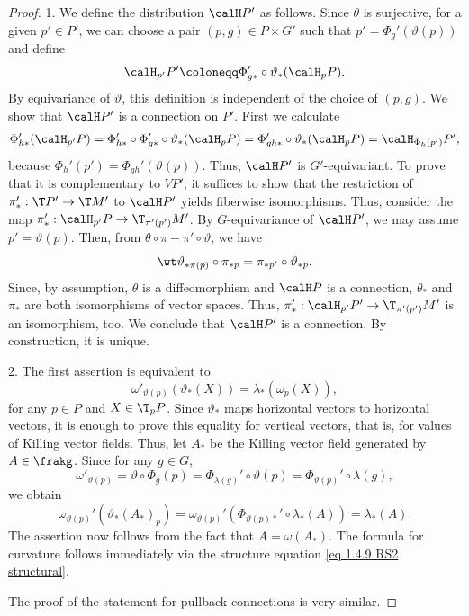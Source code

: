 \begin{proof}
    1. We define the distribution $\calH P'$ as follows. Since $\theta$ is surjective, for a given $p'\in P'$, we can choose a pair $(p,g)\in P\times G'$ such that $p'=\Phi_g'(\vartheta(p))$ and define
    \[\calH_{p'}P'\coloneqq \Phi_{g\ast}'\circ \vartheta_\ast (\calH_{p}P).\]
    By equivariance of $\vartheta$, this definition is independent of the choice of $(p,g)$. We show that $\calH P'$ is a connection on $P'$. First we calculate
    \[\Phi_{h\ast}'(\calH_{p'}P)=\Phi_{h\ast}'\circ \Phi_{g\ast}'\circ\vartheta_\ast(\calH_p P)=\Phi_{gh\ast}'\circ\vartheta_\ast(\calH_pP)=\calH_{\Phi_h(p')}P',\]
    because $\Phi_h'(p')=\Phi_{gh}'(\vartheta(p))$. Thus, $\calH P'$ is $G'$-equivariant. To prove that it is complementary to $VP'$, it suffices to show that the restriction of $\pi_\ast':\T P'\to \T M'$ to $\calH P'$ yields fiberwise isomorphisms. Thus, consider the map $\pi_\ast':\calH_{p'}P\to \T_{\pi'(p')}M'$. By $G$-equivariance of $\calH P'$, we may assume $p'=\vartheta(p)$. Then, from $\theta\circ\pi-\pi'\circ\vartheta$, we have
    \[\wt\vartheta_{\ast\pi(p)}\circ \pi_{\ast p}=\pi_{\ast p'}\circ\vartheta_{\ast p}.\]
    Since, by assumption, $\theta$ is a diffeomorphism and $\calH P$ is a connection, $\theta_\ast$ and $\pi_\ast$ are both isomorphisms of vector spaces. Thus, $\pi_\ast':\calH_{p'}P'\to \T_{\pi'(p')}M'$ is an isomorphism, too. We conclude that $\calH P'$ is a connection. By construction, it is unique.

    2. The first assertion is equivalent to
    \[\omega'_{\vartheta(p)}(\vartheta_\ast(X))=\lambda_\ast(\omega_p(X)),\]
    for any $p\in P$ and $X\in \T_pP$. Since $\vartheta_\ast$ maps horizontal vectors to horizontal vectors, it is enough to prove this equality for vertical vectors, that is, for values of Killing vector fields. Thus, let $A_\ast$ be the Killing vector field generated by $A\in\frakg$. Since for any $g\in G$,
    \[\omega'_{\vartheta(p)}=\vartheta\circ \Phi_g(p)=\Phi_{\lambda(g)}'\circ\vartheta(p)=\Phi_{\vartheta(p)}'\circ\lambda(g),\]
    we obtain
    \[\omega_{\vartheta(p)}'\left(\vartheta_\ast(A_\ast)_p\right)=\omega_{\vartheta(p)}'\left(\Phi_{\vartheta(p)\ast}'\circ \lambda_\ast(A)\right)=\lambda_\ast(A).\]
    The assertion now follows from the fact that $A=\omega(A_\ast)$. The formula for curvature follows immediately via the structure equation \eqref{eq 1.4.9 RS2 structural}.

    The proof of the statement for pullback connections is very similar.
\end{proof}

